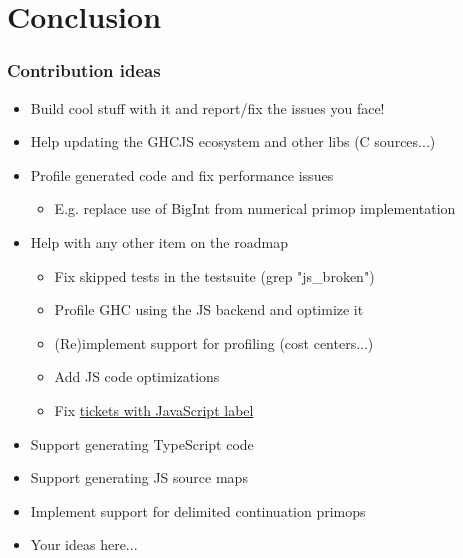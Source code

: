 \documentclass{beamer}
\begin{document}
\section{Conclusion}

\begin{frame}
\frametitle{Contribution ideas}
  \begin{itemize}
   \item Build cool stuff with it and report/fix the issues you face!
   \item Help updating the GHCJS ecosystem and other libs (C sources...)
   \item Profile generated code and fix performance issues
    \begin{itemize}
   \item E.g. replace use of BigInt from numerical primop implementation
    \end{itemize}
   \item Help with any other item on the roadmap
     \begin{itemize}
   \item Fix skipped tests in the testsuite (grep "js\_broken")
   \item Profile GHC using the JS backend and optimize it
   \item (Re)implement support for profiling (cost centers...)
   \item Add JS code optimizations
   \item Fix \href{https://gitlab.haskell.org/ghc/ghc/-/issues?label\_name=javascript}{tickets with JavaScript label}
     \end{itemize}
   \item Support generating TypeScript code
   \item Support generating JS source maps
   \item Implement support for delimited continuation primops
   \item Your ideas here...
   \end{itemize}
\end{frame}
\end{document}
